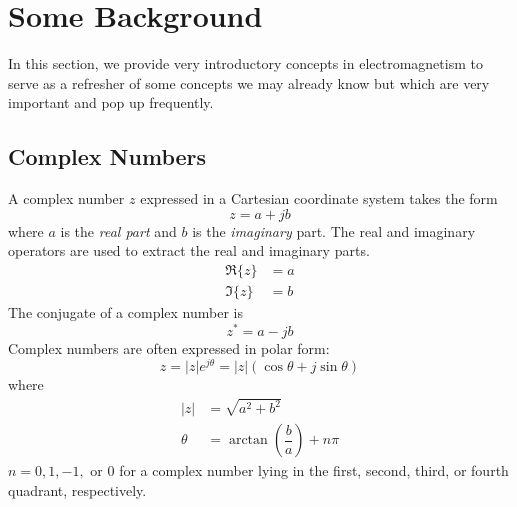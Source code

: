 \chapter{Some Background}

In this section, we provide very introductory concepts in electromagnetism to serve as a refresher of some concepts we may already know but which are very important and pop up frequently. 

\section{Complex Numbers}
A complex number $z$ expressed in a Cartesian coordinate system takes the form 
\begin{equation}
    z = a + jb
\end{equation}
where $a$ is the \textit{real part} and $b$ is the \textit{imaginary} part. The real and imaginary operators are used to extract the real and imaginary parts.
\begin{align}
    \Re\{z\} &= a \\ 
    \Im\{z\} &= b
\end{align}
The conjugate of a complex number is 
\begin{equation}
    z^* = a - jb 
\end{equation}
Complex numbers are often expressed in polar form: 
\begin{equation}
    z = |z| e^{j\theta} = |z| (\cos\theta + j\sin\theta)
\end{equation}
where 
\begin{align}
    |z| &= \sqrt{a^2 + b^2} \\ 
    \theta &= \arctan\left( \dfrac{b}{a}\right) + n\pi 
\end{align}
$n=0, 1, -1, \text{ or } 0$ for a complex number lying in the first, second, third, or fourth quadrant, respectively.

